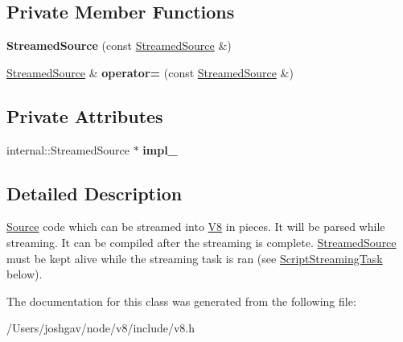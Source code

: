 \subsection*{Private Member Functions}
\begin{DoxyCompactItemize}
\item 
{\bfseries Streamed\+Source} (const \hyperlink{classv8_1_1_script_compiler_1_1_streamed_source}{Streamed\+Source} \&)\hypertarget{classv8_1_1_script_compiler_1_1_streamed_source_ad71bf1290a87bd01ed2d2b4b77e00562}{}\label{classv8_1_1_script_compiler_1_1_streamed_source_ad71bf1290a87bd01ed2d2b4b77e00562}

\item 
\hyperlink{classv8_1_1_script_compiler_1_1_streamed_source}{Streamed\+Source} \& {\bfseries operator=} (const \hyperlink{classv8_1_1_script_compiler_1_1_streamed_source}{Streamed\+Source} \&)\hypertarget{classv8_1_1_script_compiler_1_1_streamed_source_a0c5d7c6e8d02d190dafa4e6e5fa02c6b}{}\label{classv8_1_1_script_compiler_1_1_streamed_source_a0c5d7c6e8d02d190dafa4e6e5fa02c6b}

\end{DoxyCompactItemize}
\subsection*{Private Attributes}
\begin{DoxyCompactItemize}
\item 
internal\+::\+Streamed\+Source $\ast$ {\bfseries impl\+\_\+}\hypertarget{classv8_1_1_script_compiler_1_1_streamed_source_a2155cae2a024035ef3c2d134fc84411d}{}\label{classv8_1_1_script_compiler_1_1_streamed_source_a2155cae2a024035ef3c2d134fc84411d}

\end{DoxyCompactItemize}


\subsection{Detailed Description}
\hyperlink{classv8_1_1_script_compiler_1_1_source}{Source} code which can be streamed into \hyperlink{classv8_1_1_v8}{V8} in pieces. It will be parsed while streaming. It can be compiled after the streaming is complete. \hyperlink{classv8_1_1_script_compiler_1_1_streamed_source}{Streamed\+Source} must be kept alive while the streaming task is ran (see \hyperlink{classv8_1_1_script_compiler_1_1_script_streaming_task}{Script\+Streaming\+Task} below). 

The documentation for this class was generated from the following file\+:\begin{DoxyCompactItemize}
\item 
/\+Users/joshgav/node/v8/include/v8.\+h\end{DoxyCompactItemize}
